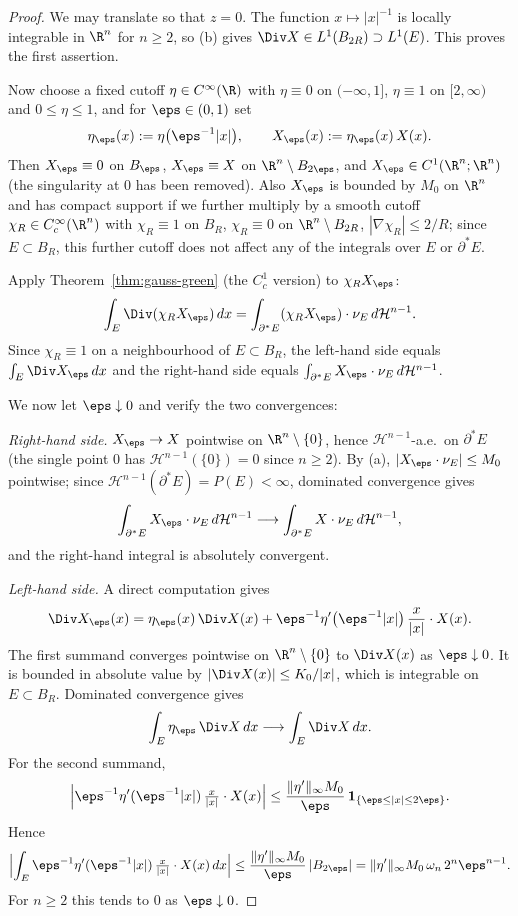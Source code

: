 \begin{proof}
We may translate so that $z=0$.  The function $x\mapsto|x|^{-1}$ is
locally integrable in $\R^n$ for $n\ge2$, so (b) gives
$\Div X\in L^1(B_{2R})\supset L^1(E)$.  This proves the first
assertion.

Now choose a fixed cutoff $\eta\in C^\infty(\R)$ with $\eta\equiv0$
on $(-\infty,1]$, $\eta\equiv1$ on $[2,\infty)$ and $0\le\eta\le1$,
and for $\eps\in(0,1)$ set
\[
   \eta_\eps(x):=\eta\bigl(\eps^{-1}|x|\bigr),
   \qquad
   X_\eps(x):=\eta_\eps(x)\,X(x).
\]
Then $X_\eps\equiv 0$ on $B_\eps$, $X_\eps\equiv X$ on $\R^n\setminus
B_{2\eps}$, and $X_\eps\in C^1(\R^n;\R^n)$ (the singularity at $0$
has been removed).  Also $X_\eps$ is bounded by $M_0$ on $\R^n$ and
has compact support if we further multiply by a smooth cutoff
$\chi_R\in C^\infty_c(\R^n)$ with $\chi_R\equiv 1$ on $B_R$,
$\chi_R\equiv0$ on $\R^n\setminus B_{2R}$, $|\nabla\chi_R|\le2/R$;
since $E\subset B_R$, this further cutoff does not affect any of the
integrals over $E$ or $\partial^*E$.

Apply Theorem~\ref{thm:gauss-green} (the $C^1_c$ version) to
$\chi_R X_\eps$:
\begin{equation}\label{eq:trunc-step}
   \int_E \Div(\chi_R X_\eps)\,dx
   =\int_{\partial^*E}(\chi_R X_\eps)\cdot\nu_E\,d\mathcal H^{n-1}.
\end{equation}
Since $\chi_R\equiv1$ on a neighbourhood of $E\subset B_R$, the
left-hand side equals $\int_E\Div X_\eps\,dx$ and the right-hand side
equals $\int_{\partial^*E}X_\eps\cdot\nu_E\,d\mathcal H^{n-1}$.

We now let $\eps\downarrow0$ and verify the two convergences:

\emph{Right-hand side.}  $X_\eps\to X$ pointwise on
$\R^n\setminus\{0\}$, hence $\mathcal H^{n-1}$-a.e.\ on $\partial^*E$
(the single point $0$ has $\mathcal H^{n-1}(\{0\})=0$ since
$n\ge2$).  By (a), $|X_\eps\cdot\nu_E|\le M_0$ pointwise; since
$\mathcal H^{n-1}(\partial^*E)=P(E)<\infty$, dominated convergence
gives
\[
   \int_{\partial^*E}X_\eps\cdot\nu_E\,d\mathcal H^{n-1}
   \longrightarrow
   \int_{\partial^*E}X\cdot\nu_E\,d\mathcal H^{n-1},
\]
and the right-hand integral is absolutely convergent.

\emph{Left-hand side.}  A direct computation gives
\[
   \Div X_\eps(x)
   =\eta_\eps(x)\,\Div X(x)
   +\eps^{-1}\eta'\bigl(\eps^{-1}|x|\bigr)\,
       \frac{x}{|x|}\cdot X(x).
\]
The first summand converges pointwise on $\R^n\setminus\{0\}$ to
$\Div X(x)$ as $\eps\downarrow0$.  It is bounded in absolute value
by $|\Div X(x)|\le K_0/|x|$, which is integrable on $E\subset B_R$.
Dominated convergence gives
\[
   \int_E\eta_\eps\,\Div X\,dx
   \longrightarrow\int_E\Div X\,dx.
\]
For the second summand,
\[
   \Bigl|\eps^{-1}\eta'(\eps^{-1}|x|)\,
         \tfrac{x}{|x|}\cdot X(x)\Bigr|
   \le \frac{\|\eta'\|_\infty M_0}{\eps}\,\mathbf 1_{\{\eps\le|x|\le2\eps\}}.
\]
Hence
\[
   \Bigl|\int_E
      \eps^{-1}\eta'(\eps^{-1}|x|)\,\tfrac{x}{|x|}\cdot X(x)\,dx\Bigr|
   \le
   \frac{\|\eta'\|_\infty M_0}{\eps}\,|B_{2\eps}|
   =\|\eta'\|_\infty M_0\,\omega_n\,2^n\eps^{n-1}.
\]
For $n\ge2$ this tends to $0$ as $\eps\downarrow0$.


\end{proof}
